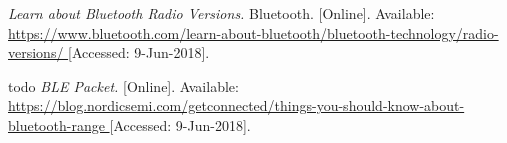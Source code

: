 \begin{thebibliography}{9}







\textit{
Learn about Bluetooth Radio Versions.
}
Bluetooth.
[Online]. Available:
\url{
https://www.bluetooth.com/learn-about-bluetooth/bluetooth-technology/radio-versions/
}
[Accessed: 9-Jun-2018].


todo
\textit{
BLE Packet.
}
[Online]. Available:
\url{
https://blog.nordicsemi.com/getconnected/things-you-should-know-about-bluetooth-range
}
[Accessed: 9-Jun-2018].















\end{thebibliography}
